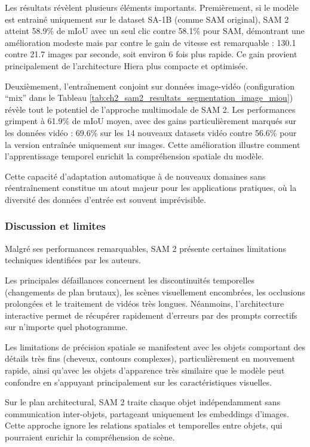Les résultats révèlent plusieurs éléments importants. Premièrement, si le modèle est entrainé uniquement sur le dataset SA-1B (comme SAM original), SAM 2 atteint 58.9\% de mIoU avec un seul clic contre 58.1\% pour SAM, démontrant une amélioration modeste mais par contre le gain de vitesse est remarquable : 130.1 contre 21.7 images par seconde, soit environ 6 fois plus rapide. Ce gain provient principalement de l'architecture Hiera plus compacte et optimisée.

Deuxièmement, l'entraînement conjoint sur données image-vidéo (configuration ``mix'' dans le Tableau \ref{tab:ch2_sam2_resultats_segmentation_image_miou}) révèle tout le potentiel de l'approche multimodale de SAM 2. Les performances grimpent à 61.9\% de mIoU moyen, avec des gains particulièrement marqués sur les données vidéo : 69.6\% sur les 14 nouveaux datasets vidéo contre 56.6\% pour la version entraînée uniquement sur images. Cette amélioration illustre comment l'apprentissage temporel enrichit la compréhension spatiale du modèle.

Cette capacité d'adaptation automatique à de nouveaux domaines sans réentraînement constitue un atout majeur pour les applications pratiques, où la diversité des données d'entrée est souvent imprévisible.

\subsubsection{Discussion et limites}
Malgré ses performances remarquables, SAM 2 présente certaines limitations techniques identifiées par les auteurs.

Les principales défaillances concernent les discontinuités temporelles (changements de plan brutaux), les scènes visuellement encombrées, les occlusions prolongées et le traitement de vidéos très longues. Néanmoins, l'architecture interactive permet de récupérer rapidement d'erreurs par des prompts correctifs sur n'importe quel photogramme.

Les limitations de précision spatiale se manifestent avec les objets comportant des détails très fins (cheveux, contours complexes), particulièrement en mouvement rapide, ainsi qu'avec les objets d'apparence très similaire que le modèle peut confondre en s'appuyant principalement sur les caractéristiques visuelles.

Sur le plan architectural, SAM 2 traite chaque objet indépendamment sans communication inter-objets, partageant uniquement les embeddings d'images. Cette approche ignore les relations spatiales et temporelles entre objets, qui pourraient enrichir la compréhension de scène.

